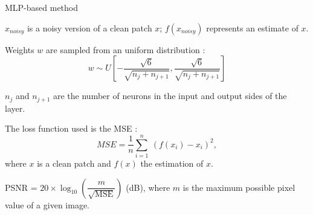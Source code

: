\documentclass[8pt]{beamer}
\begin{document}
\begin{frame}{MLP-based method}
\begin{figure}[h]
\begin{minipage}[c]{9.5cm}
{
}%
\end{minipage}%
\end{figure}

\vspace{7pt}

$x_{noisy}$ is a noisy version of a clean patch $x$; $f(x_{noisy})$ represents an estimate of $x$.

\end{frame}


\begin{frame}
\begin{mybox}
Weights $w$ are sampled from an uniform distribution :  \\%
$$w \sim U\left[-\frac{\sqrt{6}}{\sqrt{n_j + n_{j+1}}}, \frac{\sqrt{6}}{\sqrt{n_j + n_{j+1}}}\right]$$

{\footnotesize $n_j$ and $n_{j+1}$ are the number of neurons in the input and output sides of the layer.}
\end{mybox}

\begin{mybox}
The loss function used is the MSE : $$MSE = \frac{1}{n} \sum_{i=1}^{n} \ (f(x_i)-x_i)^2,$$ where $x$ is a clean patch and $f(x)$ the estimation of $x$.
\end{mybox}

\begin{mybox}
PSNR = $20 \times \log_{10}\left(\dfrac{m}{\sqrt{\mathrm{MSE}}} \right)$ (dB), where $m$ is the maximum possible pixel value of a given image.
\end{mybox}
\end{frame}
\end{document}
